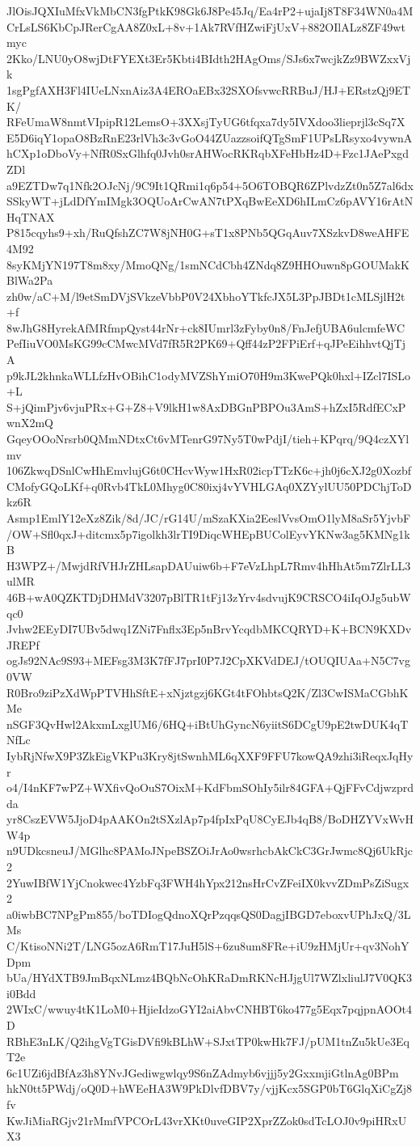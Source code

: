 JlOisJQXIuMfxVkMbCN3fgPtkK98Gk6J8Pe45Jq/Ea4rP2+ujaIj8T8F34WN0a4M
CrLsLS6KbCpJRerCgAA8Z0xL+8v+1Ak7RVfHZwiFjUxV+882OIlALz8ZF49wtmyc
2Kko/LNU0yO8wjDtFYEXt3Er5Kbti4BIdth2HAgOms/SJs6x7wcjkZz9BWZxxVjk
1sgPgfAXH3Fl4IUeLNxnAiz3A4EROaEBx32SXOfsvwcRRBuJ/HJ+ERstzQj9ETK/
RFeUmaW8nmtVIpipR12LemsO+3XXsjTyUG6tfqxa7dy5IVXdoo3lieprjl3cSq7X
E5D6iqY1opaO8BzRnE23rlVh3c3vGoO44ZUazzsoifQTgSmF1UPsLRsyxo4vywnA
hCXp1oDboVy+NfR0SxGlhfq0Jvh0srAHWocRKRqbXFeHbHz4D+Fzc1JAePxgdZDl
a9EZTDw7q1Nfk2OJcNj/9C9It1QRmi1q6p54+5O6TOBQR6ZPlvdzZt0n5Z7al6dx
SSkyWT+jLdDfYmIMgk3OQUoArCwAN7tPXqBwEeXD6hILmCz6pAVY16rAtNHqTNAX
P815cqyhs9+xh/RuQfshZC7W8jNH0G+sT1x8PNb5QGqAuv7XSzkvD8weAHFE4M92
8syKMjYN197T8m8xy/MmoQNg/1smNCdCbh4ZNdq8Z9HHOuwn8pGOUMakKBlWa2Pa
zh0w/aC+M/l9etSmDVjSVkzeVbbP0V24XbhoYTkfcJX5L3PpJBDt1cMLSjlH2t+f
8wJhG8HyrekAfMRfmpQyst44rNr+ck8IUmrl3zFyby0n8/FnJefjUBA6ulcmfeWC
PefIiuVO0MsKG99cCMwcMVd7fR5R2PK69+Qff44zP2FPiErf+qJPeEihhvtQjTjA
p9kJL2khnkaWLLfzHvOBihC1odyMVZShYmiO70H9m3KwePQk0hxl+IZcl7ISLo+L
S+jQimPjv6vjuPRx+G+Z8+V9lkH1w8AxDBGnPBPOu3AmS+hZxI5RdfECxPwnX2mQ
GqeyOOoNrsrb0QMmNDtxCt6vMTenrG97Ny5T0wPdjI/tieh+KPqrq/9Q4czXYlmv
106ZkwqDSnlCwHhEmvlujG6t0CHcvWyw1HxR02icpTTzK6c+jh0j6cXJ2g0Xozbf
CMofyGQoLKf+q0Rvb4TkL0Mhyg0C80ixj4vYVHLGAq0XZYylUU50PDChjToDkz6R
Asmp1EmlY12eXz8Zik/8d/JC/rG14U/mSzaKXia2EeslVvsOmO1lyM8aSr5YjvbF
/OW+Sfl0qxJ+ditcmx5p7igolkh3lrTI9DiqcWHEpBUColEyvYKNw3ag5KMNg1kB
H3WPZ+/MwjdRfVHJrZHLsapDAUuiw6b+F7eVzLhpL7Rmv4hHhAt5m7ZlrLL3ulMR
46B+wA0QZKTDjDHMdV3207pBlTR1tFj13zYrv4sdvujK9CRSCO4iIqOJg5ubWqc0
Jvhw2EEyDI7UBv5dwq1ZNi7Fnflx3Ep5nBrvYcqdbMKCQRYD+K+BCN9KXDvJREPf
ogJs92NAc9S93+MEFsg3M3K7fFJ7prI0P7J2CpXKVdDEJ/tOUQIUAa+N5C7vg0VW
R0Bro9ziPzXdWpPTVHhSftE+xNjztgzj6KGt4tFOhbtsQ2K/Zl3CwISMaCGbhKMe
nSGF3QvHwl2AkxmLxglUM6/6HQ+iBtUhGyncN6yiitS6DCgU9pE2twDUK4qTNfLc
IybRjNfwX9P3ZkEigVKPu3Kry8jtSwnhML6qXXF9FFU7kowQA9zhi3iReqxJqHyr
o4/I4nKF7wPZ+WXfivQoOuS7OixM+KdFbmSOhIy5ilr84GFA+QjFFvCdjwzprdda
yr8CszEVW5JjoD4pAAKOn2tSXzlAp7p4fpIxPqU8CyEJb4qB8/BoDHZYVxWvHW4p
n9UDkcsneuJ/MGlhc8PAMoJNpeBSZOiJrAo0wsrhcbAkCkC3GrJwmc8Qj6UkRjc2
2YuwIBfW1YjCnokwec4YzbFq3FWH4hYpx212nsHrCvZFeiIX0kvvZDmPsZiSugx2
a0iwbBC7NPgPm855/boTDIogQdnoXQrPzqqsQS0DagjIBGD7eboxvUPhJxQ/3LMs
C/KtisoNNi2T/LNG5ozA6RmT17JuH5lS+6zu8um8FRe+iU9zHMjUr+qv3NohYDpm
bUa/HYdXTB9JmBqxNLmz4BQbNcOhKRaDmRKNcHJjgUl7WZlxliulJ7V0QK3i0Bdd
2WIxC/wwuy4tK1LoM0+HjieIdzoGYI2aiAbvCNHBT6ko477g5Eqx7pqjpnAOOt4D
RBhE3nLK/Q2ihgVgTGisDVfi9kBLhW+SJxtTP0kwHk7FJ/pUM1tnZu5kUe3EqT2e
6c1UZi6jdBfAz3h8YNvJGediwgwlqy9S6nZAdmyb6vjjj5y2GxxmjiGtlnAg0BPm
hkN0tt5PWdj/oQ0D+hWEeHA3W9PkDlvfDBV7y/vjjKcx5SGP0bT6GlqXiCgZj8fv
KwJiMiaRGjv21rMmfVPCOrL43vrXKt0uveGIP2XprZZok0sdTcLOJ0v9piHRxUX3
